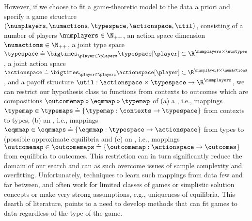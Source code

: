  However, if we choose to fit a game-theoretic model to the data a priori and specify a game structure $(\numplayers, \numactions,  \typespace, \actionspace, \util)$, consisting of a number of players $\numplayers \in \N_{++}$, an action space dimension $\numactions \in \N_{++}$, a joint type space $\typespace \doteq \bigtimes_{\player \in \players} \typespace[\player] \subset \R^{\numplayers \times \numtypes}$, a joint action space $\actionspace \doteq \bigtimes_{\player \in \players} \actionspace[\player] \subset \R^{\numplayers \times \numactions}$, and a payoff structure $\util: \actionspace \times \typespace \to \R^\numplayers$, we can restrict our hypothesis class to functions from contexts to outcomes which are compositions $\outcomemap \circ \eqmmap \circ \typemap$ of (a) a , i.e., mappings $\typemap \in \typemaps \doteq \{ \typemap: \contexts \to \typespace \}$ from contexts to types, (b) an , i.e., mappings $\eqmmap \in \eqmmaps \doteq \{ \eqmmap: \typespace \to \actionspace\}$ from types to (possible approximate equilibria and (c) an , i.e.,  mappings $\outcomemap \in \outcomemaps \doteq \{\outcomemap: \actionspace \to \outcomes\}$ from equilibria to outcomes. This restriction can in turn significantly reduce the domain of our search and can as such overcome issues of sample complexity and overfitting. Unfortunately, techniques to learn such mappings from data few and far between, and often work for limited classes of games or simplistic solution concepts or make very strong assumptions, e.g., uniqueness of equilibria. This dearth of literature, points to a need to develop methods that can fit games to data regardless of the type of the game. 

